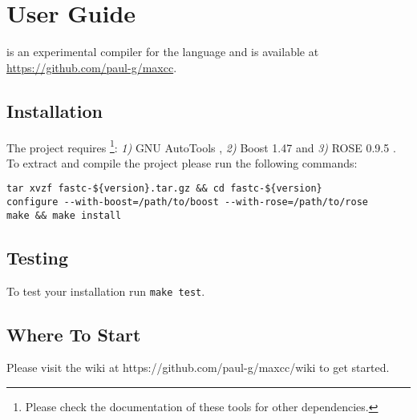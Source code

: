 \chapter{User Guide}

\fastc{} is an experimental compiler for the \FAST{} language and is
available at \url{https://github.com/paul-g/maxcc}.

\section*{Installation}

The project requires \footnote{Please check the documentation of these
  tools for other dependencies.}: \emph{1)} GNU AutoTools
\cite{Autotools}, \emph{2)} Boost 1.47\cite{boost1.47} and \emph{3)}
ROSE 0.9.5 \cite{ROSE}. To extract and compile the project please run
the following commands:

\begin{lstlisting}
tar xvzf fastc-${version}.tar.gz && cd fastc-${version}
configure --with-boost=/path/to/boost --with-rose=/path/to/rose
make && make install
\end{lstlisting}

\section*{Testing}

To test your installation run \texttt{make test}.

\section*{Where To Start}

Please visit the \FAST{} wiki at https://github.com/paul-g/maxcc/wiki
to get started.
